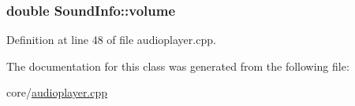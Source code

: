 \hypertarget{classSoundInfo_aa65ec68c376b1377fab3113460305162}{
\subsubsection[{volume}]{\setlength{\rightskip}{0pt plus 5cm}double Sound\+Info\+::volume}}\label{classSoundInfo_aa65ec68c376b1377fab3113460305162}


Definition at line 48 of file audioplayer.\+cpp.



The documentation for this class was generated from the following file\+:\begin{DoxyCompactItemize}
\item 
core/\hyperlink{audioplayer_8cpp}{audioplayer.\+cpp}\end{DoxyCompactItemize}
